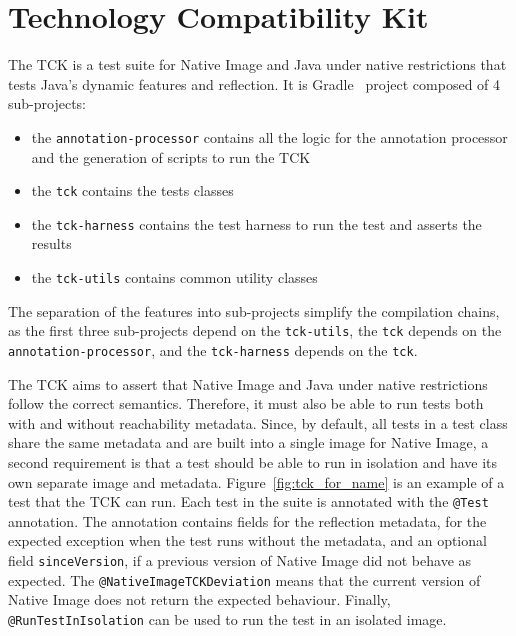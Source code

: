 \section{Technology Compatibility Kit}\label{TCK}
The TCK is a test suite for Native Image and Java under native restrictions that tests Java's dynamic features and reflection. 
It is Gradle~\cite{noauthor_gradle_2024} project composed of 4 sub-projects: 
\begin{itemize}
    \item the \verb|annotation-processor| contains all the logic for the annotation processor and the generation of scripts to run the TCK
    \item the \verb|tck| contains the tests classes
    \item the \verb|tck-harness| contains the test harness to run the test and asserts the results
    \item the \verb|tck-utils| contains common utility classes
\end{itemize}
The separation of the features into sub-projects simplify the compilation chains, as the first three sub-projects depend on the \verb|tck-utils|, the \verb|tck| depends on the \verb|annotation-processor|, and the \verb|tck-harness| depends on the \verb|tck|.

The TCK aims to assert that Native Image and Java under native restrictions follow the correct semantics. Therefore, it must also be able to run tests both with and without reachability metadata. Since, by default, all tests in a test class share the same metadata and are built into a single image for Native Image, a second requirement is that a test should be able to run in isolation and have its own separate image and metadata. 
Figure~\ref{fig:tck_for_name} is an example of a test that the TCK can run. Each test in the suite is annotated with the \verb|@Test| annotation. The annotation contains fields for the reflection metadata, for the expected exception when the test runs without the metadata, and an optional field \verb|sinceVersion|, if a previous version of Native Image did not behave as expected. The \verb|@NativeImageTCKDeviation| means that the current version of Native Image does not return the expected behaviour. Finally, \verb|@RunTestInIsolation| can be used to run the test in an isolated image. 

